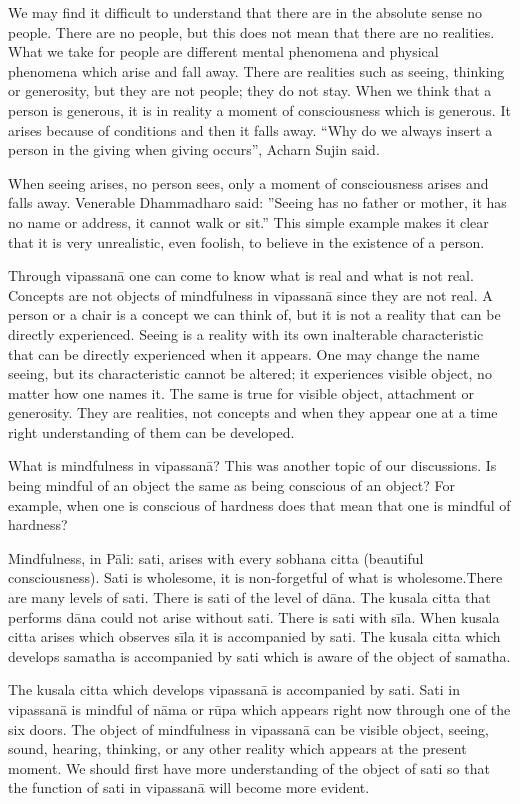 We may find it difficult to understand that there are in the absolute
sense no people. There are no people, but this does not mean that there
are no realities. What we take for people are different mental phenomena
and physical phenomena which arise and fall away. There are realities
such as seeing, thinking or generosity, but they are not people; they do
not stay. When we think that a person is generous, it is in reality a
moment of consciousness which is generous. It arises because of
conditions and then it falls away. ``Why do we always insert a person in
the giving when giving occurs'', Acharn Sujin said.

When seeing arises, no person sees, only a moment of consciousness
arises and falls away. Venerable Dhammadharo said: ''Seeing has no
father or mother, it has no name or address, it cannot walk or sit.''
This simple example makes it clear that it is very unrealistic, even
foolish, to believe in the existence of a person.

Through vipassanā one can come to know what is real and what is not
real. Concepts are not objects of mindfulness in vipassanā since they
are not real. A person or a chair is a concept we can think of, but it
is not a reality that can be directly experienced. Seeing is a reality
with its own inalterable characteristic that can be directly experienced
when it appears. One may change the name seeing, but its characteristic
cannot be altered; it experiences visible object, no matter how one
names it. The same is true for visible object, attachment or generosity.
They are realities, not concepts and when they appear one at a time
right understanding of them can be developed.

What is mindfulness in vipassanā? This was another topic of our
discussions. Is being mindful of an object the same as being conscious
of an object? For example, when one is conscious of hardness does that
mean that one is mindful of hardness?

Mindfulness, in Pāli: sati, arises with every sobhana citta (beautiful
consciousness). Sati is wholesome, it is non-forgetful of what is
wholesome.There are many levels of sati. There is sati of the level of
dāna. The kusala citta that performs dāna could not arise without sati.
There is sati with sīla. When kusala citta arises which observes sīla it
is accompanied by sati. The kusala citta which develops samatha is
accompanied by sati which is aware of the object of samatha.

The kusala citta which develops vipassanā is accompanied by sati. Sati
in vipassanā is mindful of nāma or rūpa which appears right now through
one of the six doors. The object of mindfulness in vipassanā can be
visible object, seeing, sound, hearing, thinking, or any other reality
which appears at the present moment. We should first have more
understanding of the object of sati so that the function of sati in
vipassanā will become more evident.

